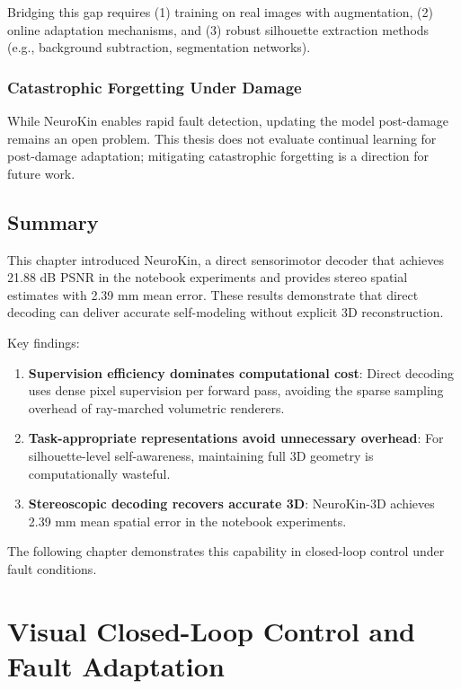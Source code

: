\documentclass[12pt,a4paper,oneside]{report}
\begin{document}
Bridging this gap requires (1) training on real images with augmentation, (2) online adaptation mechanisms, and (3) robust silhouette extraction methods (e.g., background subtraction, segmentation networks).

\subsection{Catastrophic Forgetting Under Damage}

While NeuroKin enables rapid fault detection, updating the model post-damage remains an open problem. This thesis does not evaluate continual learning for post-damage adaptation; mitigating catastrophic forgetting is a direction for future work.

\section{Summary}

This chapter introduced NeuroKin, a direct sensorimotor decoder that achieves 21.88 dB PSNR in the notebook experiments and provides stereo spatial estimates with 2.39 mm mean error. These results demonstrate that direct decoding can deliver accurate self-modeling without explicit 3D reconstruction.

Key findings:

\begin{enumerate}
    \item \textbf{Supervision efficiency dominates computational cost}: Direct decoding uses dense pixel supervision per forward pass, avoiding the sparse sampling overhead of ray-marched volumetric renderers.
    \item \textbf{Task-appropriate representations avoid unnecessary overhead}: For silhouette-level self-awareness, maintaining full 3D geometry is computationally wasteful.
    \item \textbf{Stereoscopic decoding recovers accurate 3D}: NeuroKin-3D achieves 2.39 mm mean spatial error in the notebook experiments.
\end{enumerate}

The following chapter demonstrates this capability in closed-loop control under fault conditions.

\chapter{Visual Closed-Loop Control and Fault Adaptation}
\end{document}
